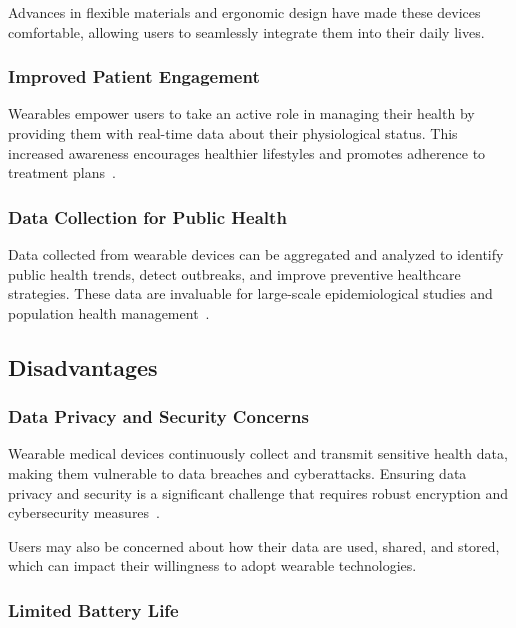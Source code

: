\documentclass[journal]{IEEEtran}
\begin{document}
        Advances in flexible materials and ergonomic design have made these devices comfortable, allowing users to seamlessly integrate them into their daily lives.

        \subsubsection{Improved Patient Engagement}

        Wearables empower users to take an active role in managing their health by providing them with real-time data about their physiological status. This increased awareness encourages healthier lifestyles and promotes adherence to treatment plans~\cite{Iqbal2016}.

        \subsubsection{Data Collection for Public Health}

        Data collected from wearable devices can be aggregated and analyzed to identify public health trends, detect outbreaks, and improve preventive healthcare strategies. These data are invaluable for large-scale epidemiological studies and population health management~\cite{Cusack2024}.

    \subsection{Disadvantages}

        \subsubsection{Data Privacy and Security Concerns}

        Wearable medical devices continuously collect and transmit sensitive health data, making them vulnerable to data breaches and cyberattacks. Ensuring data privacy and security is a significant challenge that requires robust encryption and cybersecurity measures~\cite{Iqbal2016}.

        Users may also be concerned about how their data are used, shared, and stored, which can impact their willingness to adopt wearable technologies.

        \subsubsection{Limited Battery Life}
\end{document}
